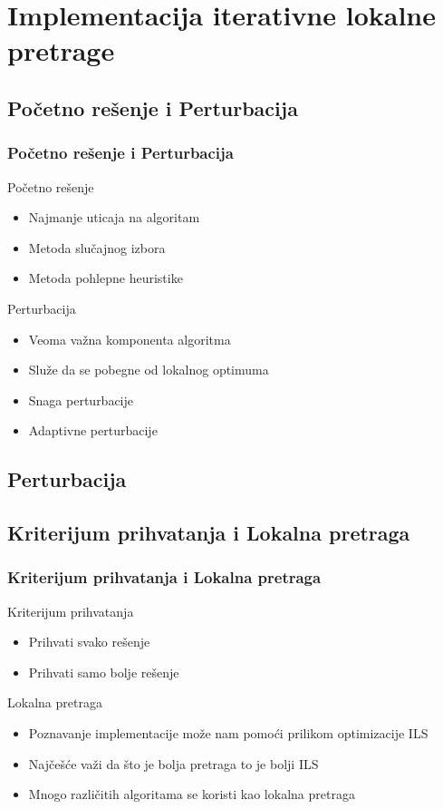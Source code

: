 \documentclass{beamer}
\begin{document}
\section{Implementacija iterativne lokalne pretrage}
\subsection{Početno rešenje i Perturbacija}
\begin{frame}[fragile]\frametitle{Početno rešenje i Perturbacija}
  Početno rešenje
  \begin{itemize}
    \item Najmanje uticaja na algoritam
    \item Metoda slučajnog izbora
    \item Metoda pohlepne heuristike
  \end{itemize}
  Perturbacija
  \begin{itemize}
    \item Veoma važna komponenta algoritma
    \item Služe da se pobegne od lokalnog optimuma
    \item Snaga perturbacije
    \item Adaptivne perturbacije
  \end{itemize}
	\subsection{Perturbacija}

\end{frame}




\subsection{Kriterijum prihvatanja i Lokalna pretraga}
\begin{frame}[fragile]\frametitle{Kriterijum prihvatanja i Lokalna pretraga}
	Kriterijum prihvatanja
  \begin{itemize}
    \item Prihvati svako rešenje
    \item Prihvati samo bolje rešenje
  \end{itemize}
  Lokalna pretraga
  \begin{itemize}
    \item Poznavanje implementacije može nam pomoći prilikom optimizacije ILS
    \item Najčešće važi da što je bolja pretraga to je bolji ILS
    \item Mnogo različitih algoritama se koristi kao lokalna pretraga
  \end{itemize}
\end{frame}
\end{document}
